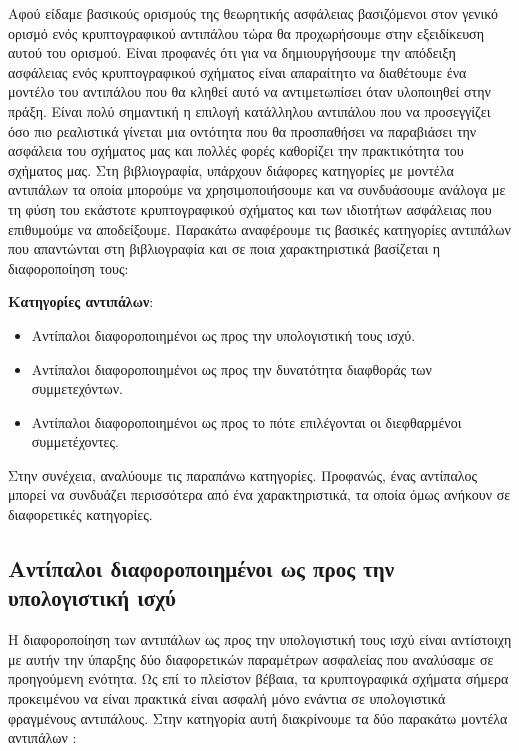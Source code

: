 Αφού είδαμε βασικούς ορισμούς της θεωρητικής ασφάλειας βασιζόμενοι στον γενικό ορισμό ενός κρυπτογραφικού αντιπάλου τώρα θα προχωρήσουμε στην εξειδίκευση αυτού του ορισμού. Είναι προφανές ότι για να δημιουργήσουμε την απόδειξη ασφάλειας ενός κρυπτογραφικού σχήματος είναι απαραίτητο να διαθέτουμε ένα μοντέλο του αντιπάλου που θα κληθεί αυτό να αντιμετωπίσει όταν υλοποιηθεί στην πράξη. Είναι πολύ σημαντική η επιλογή κατάλληλου αντιπάλου που να προσεγγίζει όσο πιο ρεαλιστικά γίνεται μια οντότητα που θα προσπαθήσει να παραβιάσει την ασφάλεια του σχήματος μας και πολλές φορές καθορίζει την πρακτικότητα του σχήματος μας. Στη βιβλιογραφία, υπάρχουν διάφορες κατηγορίες με μοντέλα αντιπάλων τα οποία μπορούμε να χρησιμοποιήσουμε και να συνδυάσουμε ανάλογα με τη φύση του εκάστοτε κρυπτογραφικού σχήματος και των ιδιοτήτων ασφάλειας που επιθυμούμε να αποδείξουμε. Παρακάτω αναφέρουμε τις βασικές κατηγορίες αντιπάλων που απαντώνται στη βιβλιογραφία και σε ποια χαρακτηριστικά βασίζεται η διαφοροποίηση τους:

\begin{definition}
\textbf{Κατηγορίες αντιπάλων}:
\begin{itemize}
    \item Αντίπαλοι διαφοροποιημένοι ως προς την υπολογιστική τους ισχύ.
    \item Αντίπαλοι διαφοροποιημένοι ως προς την δυνατότητα διαφθοράς των συμμετεχόντων.
    \item Αντίπαλοι διαφοροποιημένοι ως προς το πότε επιλέγονται οι διεφθαρμένοι συμμετέχοντες.
\end{itemize}
\end{definition}

Στην συνέχεια, αναλύουμε τις παραπάνω κατηγορίες. Προφανώς, ένας αντίπαλος μπορεί να συνδυάζει περισσότερα από ένα χαρακτηριστικά, τα οποία όμως ανήκουν σε διαφορετικές κατηγορίες.

\subsection{Αντίπαλοι διαφοροποιημένοι ως προς την υπολογιστική ισχύ}

Η διαφοροποίηση των αντιπάλων ως προς την υπολογιστική τους ισχύ είναι αντίστοιχη με αυτήν την ύπαρξης δύο διαφορετικών παραμέτρων ασφαλείας που αναλύσαμε σε προηγούμενη ενότητα. Ως επί το πλείστον βέβαια, τα κρυπτογραφικά σχήματα σήμερα προκειμένου να είναι πρακτικά είναι ασφαλή μόνο ενάντια σε υπολογιστικά φραγμένους αντιπάλους. Στην κατηγορία αυτή διακρίνουμε τα δύο παρακάτω μοντέλα αντιπάλων :

